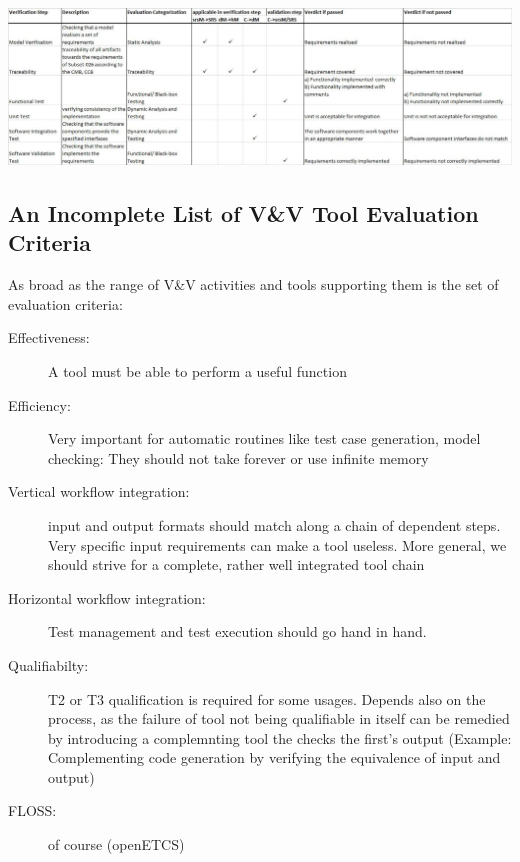 \documentclass{template/openetcs_article}
\begin{document}
\begin{table}[h]
\caption{Verification Steps and Techniques in openETCS} %
\label{tab:techniques}
\includegraphics[width=\textwidth]{techniques.pdf}
\end{table}





\subsection{An Incomplete List of V\&V Tool Evaluation Criteria}
As broad as the range of V\&V activities and tools supporting them is
the set of evaluation criteria:

\begin{description}
\item[Effectiveness:] A tool must be able to perform a useful function
\item[Efficiency:] Very important for automatic routines like test
  case generation, model checking: They should not take forever or use
  infinite memory
\item[Vertical workflow integration:] input and output formats should
  match along a chain of dependent steps. Very specific input
  requirements can make a tool useless. More general, we should strive
  for a complete, rather well integrated tool chain
\item[Horizontal workflow integration:] Test management and test
  execution should go hand in hand.
\item[Qualifiabilty:] T2 or T3 qualification is required for some
  usages. Depends also on the process, as the failure of tool not
  being qualifiable in itself can be remedied by introducing a
  complemnting tool the checks the first's output (Example:
  Complementing code generation by verifying the equivalence of input
  and output)
\item[FLOSS:] of course (openETCS)
\end{description}
\end{document}
